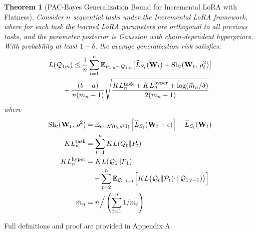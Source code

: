 \documentclass[letterpaper]{article} %
\newtheorem{theorem}{Theorem}
\begin{document}
\begin{theorem}[PAC-Bayes Generalization Bound for Incremental LoRA with Flatness]
Consider $n$ sequential tasks under the Incremental LoRA framework, where for each task the learned LoRA parameters are orthogonal to all previous tasks, and the parameter posterior is Gaussian with chain-dependent hyperpriors. With probability at least $1-\delta$, the average generalization risk satisfies:
\begin{align}
      &  L(\mathcal{Q}_{1:n}) \leq  \frac{1}{n} \sum_{t=1}^{n}
        \mathbb{E}_{P_{1:n} \sim \mathcal{Q}_{1:n}}\big[
            \widehat{L}_{S_t}(\mathbf{W}_{t}) \notag
 + \mathrm{Sh}_t(\mathbf{W}_{t} ,\, \rho_t^2)
        \big] \notag\\
&  \qquad + \frac{(b-a) }{n(\bar{m}_n - 1)}\sqrt{
            \frac{KL_{n}^{\text{task}} + KL_{n}^{\text{hyper}} +\log(\bar{m}_{n}/\delta)}{2(\bar{m}_{n} - 1)}
        }
\end{align}
where
\begin{align}
\mathrm{Sh}_t(\mathbf{W}_{t},\, \rho^2) 
    &= \mathbb{E}_{\epsilon \sim \mathcal{N}(0,\, \rho^2 \mathbf{I})} 
        \left[
            \widehat{L}_{S_t}(\mathbf{W}_{t}  + \epsilon)
        \right] 
        - \widehat{L}_{S_t}(\mathbf{W}_{t} ) \notag\\
KL^{\text{task}}_n &= \sum_{t=1}^n KL(Q_t \| P_t) \notag \\
KL^{\text{hyper}}_n &= KL(\mathcal{Q}_1 \| \mathcal{P}_1) \notag \\
   &\quad + \sum_{t=2}^n 
        \mathbb{E}_{\mathcal{Q}_{1:t-1}} \Big[
            KL\big(\mathcal{Q}_t \| \mathcal{P}_t(\cdot\,|\,\mathcal{Q}_{1:t-1})\big)
        \Big] \notag\\
\bar{m}_n &= n \Big/ \left(\sum_{t=1}^n 1/m_t\right) \notag
\end{align}
\end{theorem}
Full definitions and proof are provided in Appendix A.
\end{document}
